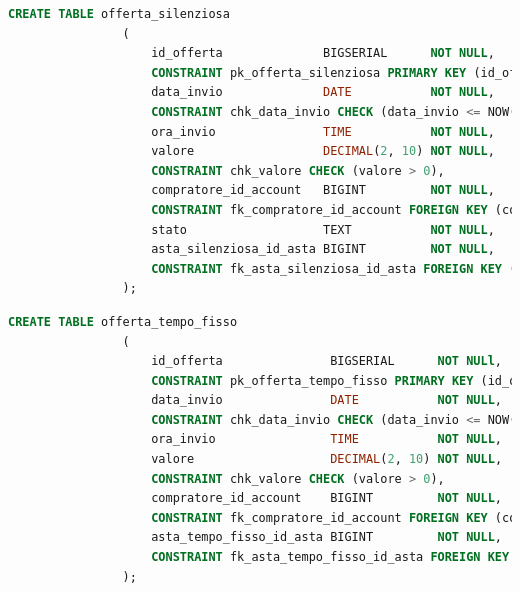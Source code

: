             \begin{lstlisting}[language=SQL, caption=Relazione offerta silenziosa]
                CREATE TABLE offerta_silenziosa
                (
                    id_offerta              BIGSERIAL      NOT NULL,
                    CONSTRAINT pk_offerta_silenziosa PRIMARY KEY (id_offerta),
                    data_invio              DATE           NOT NULL,
                    CONSTRAINT chk_data_invio CHECK (data_invio <= NOW()),
                    ora_invio               TIME           NOT NULL,
                    valore                  DECIMAL(2, 10) NOT NULL,
                    CONSTRAINT chk_valore CHECK (valore > 0),
                    compratore_id_account   BIGINT         NOT NULL,
                    CONSTRAINT fk_compratore_id_account FOREIGN KEY (compratore_id_account) REFERENCES compratore (id_account) ON UPDATE CASCADE ON DELETE CASCADE,
                    stato                   TEXT           NOT NULL,
                    asta_silenziosa_id_asta BIGINT         NOT NULL,
                    CONSTRAINT fk_asta_silenziosa_id_asta FOREIGN KEY (asta_silenziosa_id_asta) REFERENCES asta_silenziosa (id_asta) ON UPDATE CASCADE ON DELETE CASCADE
                );
            \end{lstlisting}
            
            \begin{lstlisting}[language=SQL, caption=Relazione offerta a tempo fisso]
                CREATE TABLE offerta_tempo_fisso
                (
                    id_offerta               BIGSERIAL      NOT NULl,
                    CONSTRAINT pk_offerta_tempo_fisso PRIMARY KEY (id_offerta),
                    data_invio               DATE           NOT NULL,
                    CONSTRAINT chk_data_invio CHECK (data_invio <= NOW()),
                    ora_invio                TIME           NOT NULL,
                    valore                   DECIMAL(2, 10) NOT NULL,
                    CONSTRAINT chk_valore CHECK (valore > 0),
                    compratore_id_account    BIGINT         NOT NULL,
                    CONSTRAINT fk_compratore_id_account FOREIGN KEY (compratore_id_account) REFERENCES compratore (id_account) ON UPDATE CASCADE ON DELETE CASCADE,
                    asta_tempo_fisso_id_asta BIGINT         NOT NULL,
                    CONSTRAINT fk_asta_tempo_fisso_id_asta FOREIGN KEY (asta_tempo_fisso_id_asta) REFERENCES asta_tempo_fisso (id_asta) ON UPDATE CASCADE ON DELETE CASCADE
                );
            \end{lstlisting}